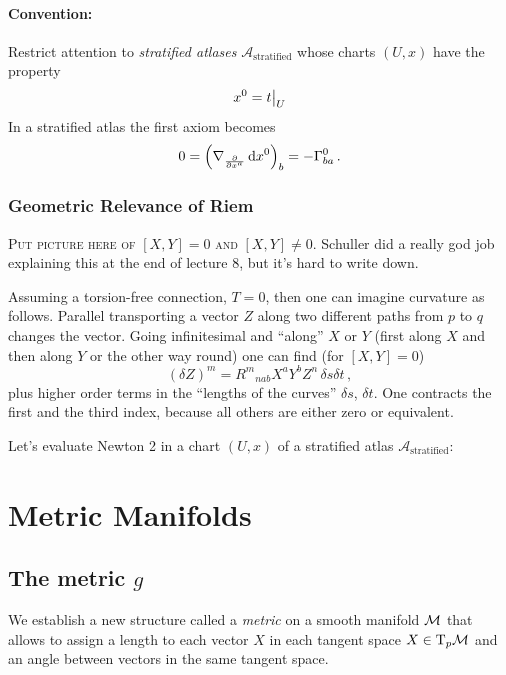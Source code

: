 \documentclass[11pt, a4paper, twocolumn]{article} %
\begin{document}
\paragraph{Convention:}
Restrict attention to \textit{stratified atlases} $\mathcal{A}_\text{stratified}$
whose charts $(U,x)$ have the property
\begin{equation}
    x^0 = t\big|_U
\end{equation}
In a stratified atlas the first axiom becomes
\begin{align}
    0 = \left( \nabla_\frac{\partial}{\partial x^a} \operatorname{d\!} x^0 \right)_b = -\Gamma^0_{ba}\,.
\end{align}

\subsubsection{Geometric Relevance of Riem}
\begin{center}
    \textsc{Put picture here of $[X,Y] = 0$ and
    $[X,Y] \neq 0$}.
    Schuller did a really god job explaining this at the end of lecture
    8, but it's hard to write down.
\end{center}

Assuming a torsion-free connection, $T=0$, then one can imagine curvature as follows.
Parallel transporting a vector $Z$ along two different paths from $p$ to $q$
changes the vector.
Going infinitesimal and ``along'' $X$ or $Y$ (first along $X$ and then along $Y$ or the other
way round) one can find (for $[X,Y] = 0$)
\begin{equation}
    (\delta Z)^m = R^m{}_{nab}X^aY^bZ^n\,\delta s\delta t\,,
\end{equation}
plus higher order terms in the ``lengths of the curves'' $\delta s$, $\delta t$.
One contracts the first and the third index, because all others are either zero or equivalent.

Let's evaluate Newton 2 in a chart $(U,x)$ of a stratified atlas $\mathcal{A}_\text{stratified}$:


\section{Metric Manifolds}
\subsection[The metric g]{The metric $g$}
We establish a new structure called a \textit{metric} on a smooth manifold $\mathcal{M}$
that allows to assign a length to each vector $X$ in each tangent space $X\in
\T_p\M$ and an angle between vectors in the same tangent space.
\end{document}
